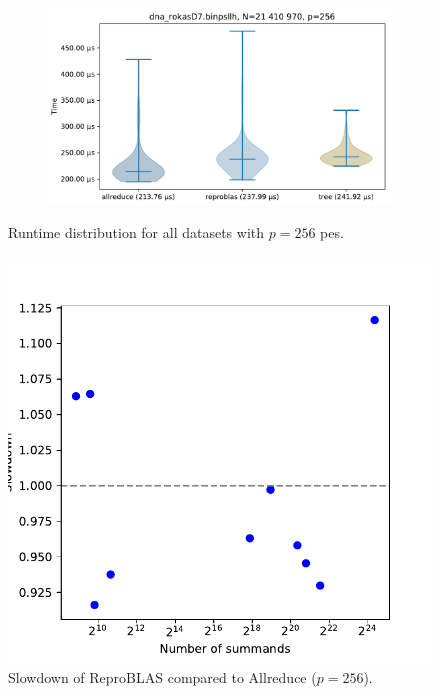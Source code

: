\begin{figure}\centering\ContinuedFloat


\begin{subfigure}{\textwidth}
\centering
\includegraphics[scale=\mScale]{figures/violinRokasD7.pdf}
\end{subfigure}

\caption{Runtime distribution for all datasets with $p=256$ \glspl{pe}.}

\end{figure}

\begin{figure}
\centering
\includegraphics[scale=\mScale]{figures/slowdownAllreduceReproblas.pdf}
\caption{Slowdown of ReproBLAS compared to Allreduce ($p = 256$).}
\label{fig:slowdownAllreduceReproblas}
\end{figure}

